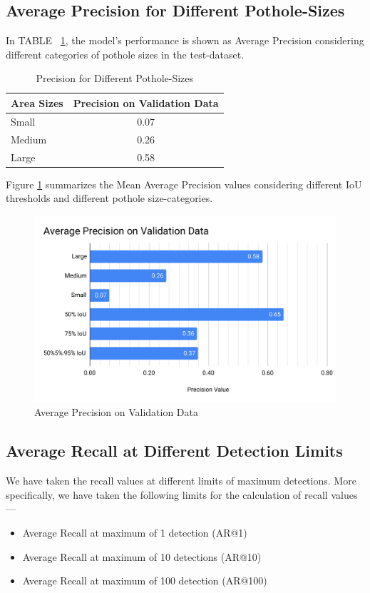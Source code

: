 \documentclass[conference]{IEEEtran}
\begin{document}
\subsection{Average Precision for Different Pothole-Sizes}
In TABLE ~\ref{tab:precision_sizes}, the model's performance is shown as Average Precision considering different categories of pothole sizes in the test-dataset.
    
\begin{table}[h]
  \centering
  \caption{Precision for Different Pothole-Sizes}
  \label{tab:precision_sizes}
  \renewcommand{\arraystretch}{1.3}
  \begin{tabular}{l||c}
    \bfseries{Area Sizes} & \bfseries{Precision on Validation Data} \\\hline\hline
    Small                 & 0.07                                    \\\hline
    Medium                & 0.26                                    \\\hline
    Large                 & 0.58                                    \\\hline
  \end{tabular}
\end{table}
  
Figure \ref{fig:mAP} summarizes the Mean Average Precision values considering different IoU thresholds and different pothole size-categories.
  
\begin{figure}[h]
  \centering
  \includegraphics[width=.95\columnwidth]{img/Average-Precision-on-Validation-Data}
  \caption{Average Precision on Validation Data}
  \label{fig:mAP}
\end{figure}
  
\subsection{Average Recall at Different Detection Limits}
We have taken the recall values at different limits of maximum detections. More specifically, we have taken the following limits for the calculation of recall values---
\begin{itemize}
  \item {Average Recall at maximum of 1 detection (AR@1)}
  \item {Average Recall at maximum of 10 detections (AR@10)}
  \item {Average Recall at maximum of 100 detection (AR@100)}
\end{itemize}
   
\end{document}
